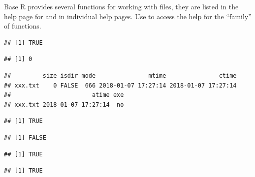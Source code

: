 \documentclass[krantz2,ChapterTOCs]{krantz}\usepackage{knitr}
\begin{document}
Base R provides several functions for working with files, they are listed in the help page for  and in individual help pages. Use  to access the help for the ``family'' of functions.

\begin{knitrout}\footnotesize
{}\color{fgcolor}\begin{kframe}
\begin{alltt}
 \hlstd{(}\hlopt{!}\hlstd{(}\hlstd{)) \{}
  \hlstd{(}\hlstd{)}
\hlstd{\}}
\end{alltt}
\begin{verbatim}
## [1] TRUE
\end{verbatim}
\begin{alltt}
\hlstd{(}\hlstd{)}
\end{alltt}
\begin{verbatim}
## [1] 0
\end{verbatim}
\begin{alltt}
\hlstd{(}\hlstd{)}
\end{alltt}
\begin{verbatim}
##         size isdir mode               mtime               ctime
## xxx.txt    0 FALSE  666 2018-01-07 17:27:14 2018-01-07 17:27:14
##                       atime exe
## xxx.txt 2018-01-07 17:27:14  no
\end{verbatim}
\begin{alltt}
\hlstd{(}\hlstd{,} \hlstd{)}
\end{alltt}
\begin{verbatim}
## [1] TRUE
\end{verbatim}
\begin{alltt}
\hlstd{(}\hlstd{)}
\end{alltt}
\begin{verbatim}
## [1] FALSE
\end{verbatim}
\begin{alltt}
\hlstd{(}\hlstd{)}
\end{alltt}
\begin{verbatim}
## [1] TRUE
\end{verbatim}
\begin{alltt}
\hlstd{(}\hlstd{)}
\end{alltt}
\begin{verbatim}
## [1] TRUE
\end{verbatim}
\end{kframe}
\end{knitrout}
\end{document}
